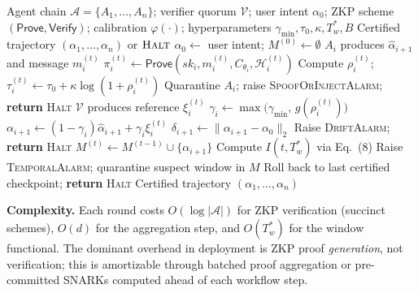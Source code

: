 \documentclass[conference]{IEEEtran}
\begin{document}
\begin{algorithm}[t]
\caption{\textsc{TRACE-MAS} Unified Runtime}
\begin{algorithmic}[1]
\REQUIRE Agent chain $\mathcal{A}=\{A_1,\ldots,A_n\}$; verifier
quorum $\mathcal{V}$; user intent $\alpha_0$;
ZKP scheme $(\mathsf{Prove},\mathsf{Verify})$;
calibration $\varphi(\cdot)$; hyperparameters
$\gamma_{\min}, \tau_0, \kappa, T_w^{*}, B$
\ENSURE Certified trajectory $(\alpha_1,\ldots,\alpha_n)$ or
$\textsc{Halt}$
\STATE $\alpha_0 \leftarrow$ user intent;\;
$M^{(0)} \leftarrow \emptyset$
    \STATE $A_i$ produces $\hat{\alpha}_{i+1}$
    and message $m_i^{(t)}$
    \STATE $\pi_i^{(t)} \leftarrow \mathsf{Prove}(sk_i,
    m_i^{(t)}, C_{\theta_i}, \mathcal{H}_i^{(t)})$
    \STATE Compute $\rho_i^{(t)}$;\;
    $\tau_i^{(t)} \leftarrow \tau_0 +
    \kappa\log(1+\rho_i^{(t)})$
      \STATE Quarantine $A_i$;\;
      raise \textsc{SpoofOrInjectAlarm};\;
      \textbf{return} \textsc{Halt}
    \ENDIF
    \STATE $\mathcal{V}$ produces reference $\xi_i^{(t)}$
    \STATE $\gamma_i \leftarrow
    \max\bigl(\gamma_{\min},\,g(\rho_i^{(t)})\bigr)$
    \STATE $\alpha_{i+1} \leftarrow
    (1-\gamma_i)\hat{\alpha}_{i+1} + \gamma_i \xi_i^{(t)}$
    \STATE $\delta_{i+1} \leftarrow
    \|\alpha_{i+1} - \alpha_0\|_2$
      \STATE Raise \textsc{DriftAlarm};\;
      \textbf{return} \textsc{Halt}
    \ENDIF
    \STATE $M^{(t)} \leftarrow M^{(t-1)} \cup
    \{\alpha_{i+1}\}$
  \ENDFOR
  \STATE Compute $I(t, T_w^{*})$ via Eq.~(8)
    \STATE Raise \textsc{TemporalAlarm};\;
    quarantine suspect window in $M$
    \STATE Roll back to last certified checkpoint;\;
    \textbf{return} \textsc{Halt}
  \ENDIF
\ENDFOR
\RETURN Certified trajectory $(\alpha_1,\ldots,\alpha_n)$
\end{algorithmic}
\end{algorithm}

\noindent\textbf{Complexity.}
Each round costs $O(\log|\mathcal{A}|)$ for ZKP verification
(succinct schemes), $O(d)$ for the aggregation step, and
$O(T_w^{*})$ for the window functional. The dominant overhead in
deployment is ZKP proof \emph{generation}, not verification;
this is amortizable through batched proof aggregation or
pre-committed SNARKs computed ahead of each workflow step.
\end{document}
